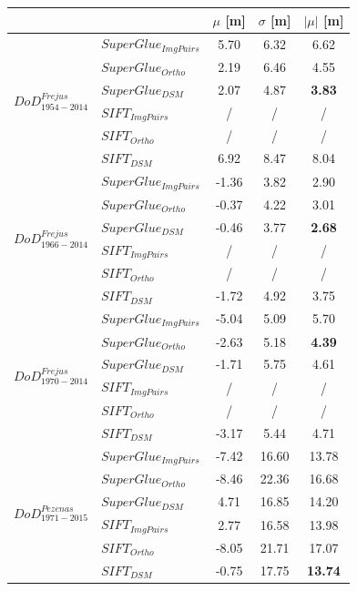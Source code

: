 \begin{table}%
	\footnotesize
	\centering
	\begin{tabular}{||l|l|c|c|c||}\hline
		& &$\mu$ [m]&$\sigma$ [m]&$|\mu|$ [m]\\\hline\hline
		\multirow{6}{*}{$DoD^{Frejus}_{1954-2014}$}
		&${SuperGlue_{ImgPairs}}$ & 5.70 & 6.32 & 6.62\\
		&${SuperGlue_{Ortho}}$ & 2.19 & 6.46 & 4.55\\
		&${SuperGlue_{DSM}}$ & 2.07 & 4.87 & \textbf{3.83} \\
		&${SIFT_{ImgPairs}}$ & / & / & / \\
		&${SIFT_{Ortho}}$ & / & / & / \\
		&${SIFT_{DSM}}$ & 6.92 & 8.47 & 8.04\\\hline
		
		\multirow{6}{*}{$DoD^{Frejus}_{1966-2014}$}
		&${SuperGlue_{ImgPairs}}$ & -1.36 & 3.82 & 2.90\\
		&${SuperGlue_{Ortho}}$ & -0.37 & 4.22 & 3.01\\
		&${SuperGlue_{DSM}}$ & -0.46 & 3.77 & \textbf{2.68}\\
		&${SIFT_{ImgPairs}}$ & / & / & / \\
		&${SIFT_{Ortho}}$ & / & / & / \\
		&${SIFT_{DSM}}$ & -1.72 & 4.92 & 3.75\\\hline
		
		\multirow{6}{*}{$DoD^{Frejus}_{1970-2014}$}
		&${SuperGlue_{ImgPairs}}$ & -5.04 & 5.09 & 5.70\\
		&${SuperGlue_{Ortho}}$ & -2.63 & 5.18 & \textbf{4.39}\\
		&${SuperGlue_{DSM}}$ & -1.71 & 5.75 & 4.61\\
		&${SIFT_{ImgPairs}}$ & / & / & / \\
		&${SIFT_{Ortho}}$ & / & / & / \\
		&${SIFT_{DSM}}$ & -3.17 & 5.44 & 4.71\\\hline
		
		
		\multirow{6}{*}{$DoD^{Pezenas}_{1971-2015}$}
		&${SuperGlue_{ImgPairs}}$ & -7.42 & 16.60 & 13.78\\
		&${SuperGlue_{Ortho}}$ & -8.46 & 22.36 & 16.68\\
		&${SuperGlue_{DSM}}$ & 4.71 & 16.85 & 14.20\\
		&${SIFT_{ImgPairs}}$ & 2.77 & 16.58 & 13.98\\
		&${SIFT_{Ortho}}$ & -8.05 & 21.71 & 17.07\\
		&${SIFT_{DSM}}$ & -0.75 & 17.75 & \textbf{13.74}\\\hline
		

\end{tabular}
\end{table}
